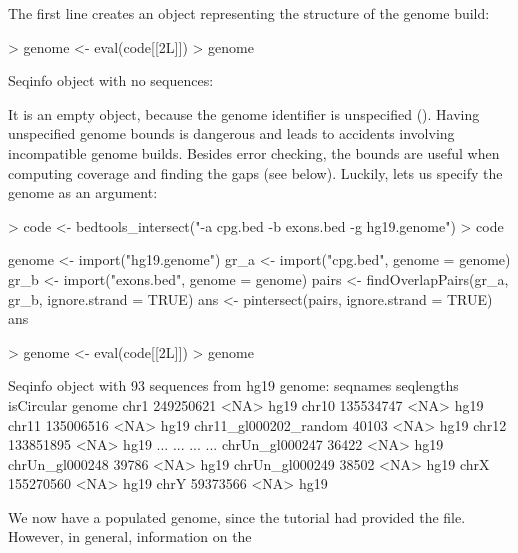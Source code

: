 \documentclass[10pt]{article}
\begin{document}
The first line creates an object representing the structure of the
genome build:
\begin{Schunk}
\begin{Sinput}
> genome <- eval(code[[2L]])
> genome
\end{Sinput}
\begin{Soutput}
Seqinfo object with no sequences:
\end{Soutput}
\end{Schunk}
%
It is an empty object, because the genome identifier is unspecified
(). Having unspecified genome bounds is
dangerous and leads to accidents involving incompatible genome
builds. Besides error checking, the bounds are useful when computing
coverage and finding the gaps (see below). Luckily,
 lets us specify the genome as an argument:
\begin{Schunk}
\begin{Sinput}
> code <- bedtools_intersect("-a cpg.bed -b exons.bed -g hg19.genome")
> code
\end{Sinput}
\begin{Soutput}
{
    genome <- import("hg19.genome")
    gr_a <- import("cpg.bed", genome = genome)
    gr_b <- import("exons.bed", genome = genome)
    pairs <- findOverlapPairs(gr_a, gr_b, ignore.strand = TRUE)
    ans <- pintersect(pairs, ignore.strand = TRUE)
    ans
}
\end{Soutput}
\begin{Sinput}
> genome <- eval(code[[2L]])
> genome
\end{Sinput}
\begin{Soutput}
Seqinfo object with 93 sequences from hg19 genome:
  seqnames              seqlengths isCircular genome
  chr1                   249250621       <NA>   hg19
  chr10                  135534747       <NA>   hg19
  chr11                  135006516       <NA>   hg19
  chr11_gl000202_random      40103       <NA>   hg19
  chr12                  133851895       <NA>   hg19
  ...                          ...        ...    ...
  chrUn_gl000247             36422       <NA>   hg19
  chrUn_gl000248             39786       <NA>   hg19
  chrUn_gl000249             38502       <NA>   hg19
  chrX                   155270560       <NA>   hg19
  chrY                    59373566       <NA>   hg19
\end{Soutput}
\end{Schunk}
We now have a populated genome, since the tutorial had provided the
 file. However, in general, information on the
\end{document}
